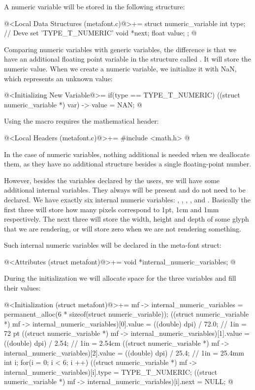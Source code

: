 
A numeric variable will be stored in the following structure:

\iniciocodigo
@<Local Data Structures (metafont.c)@>+=
struct numeric_variable{
  int type; // Deve set 'TYPE_T_NUMERIC'
  void *next;
  float value;
};
@
\fimcodigo

Comparing numeric variables with generic variables, the difference is
that we have an additional floating point variable in the structure
called . It will store the numeric value. When we
create a numeric variable, we initialize it with NaN, which represents
an unknown value:

\iniciocodigo
@<Initializing New Variable@>=
if(type == TYPE_T_NUMERIC){
  ((struct numeric_variable *) var) -> value = NAN;
}
@
\fimcodigo

Using the macro  requires the mathematical header:

\iniciocodigo
@<Local Headers (metafont.c)@>+=
#include <math.h>
@
\fimcodigo

In the case of numeric variables, nothing additional is needed when we
deallocate them, as they have no additional structure besides a single
floating-point number.

However, besides the variables declared by the users, we will have
some additional internal variables. They always will be present and do
not need to be declared. We have exactly six internal numeric
variables: , , , ,
 and . Basically the first three
will store how many pixels correspond to 1pt, 1cm and 1mm
respectively. The next three will store the width, height and depth of
some glyph that we are rendering, or will store zero when we are not
rendering something.

Such internal numeric variables will be declared in the meta-font
struct:

\iniciocodigo
@<Attributes (struct metafont)@>+=
void *internal_numeric_variables;
@
\fimcodigo

During the initialization we will allocate space for the three
variables and fill their values:

\iniciocodigo
@<Initialization (struct metafont)@>+=
mf -> internal_numeric_variables =
             permanent_alloc(6 * sizeof(struct numeric_variable));
((struct numeric_variable *) mf -> internal_numeric_variables)[0].value =
   ((double) dpi) / 72.0; // 1in = 72 pt
((struct numeric_variable *) mf -> internal_numeric_variables)[1].value =
   ((double) dpi) / 2.54; // 1in = 2.54cm
((struct numeric_variable *) mf -> internal_numeric_variables)[2].value =
   ((double) dpi) / 25.4; // 1in = 25.4mm
{
  int i;
  for(i = 0; i < 6; i ++){
    ((struct numeric_variable *)
      mf -> internal_numeric_variables)[i].type = TYPE_T_NUMERIC;
    ((struct numeric_variable *)
      mf -> internal_numeric_variables)[i].next = NULL;
  }
}
@
\fimcodigo

